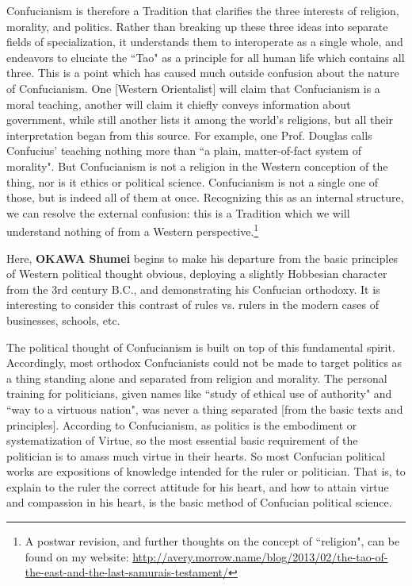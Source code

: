 Confucianism is therefore a Tradition that clarifies the three interests of religion, morality, and politics. Rather than breaking up these three ideas into separate fields of specialization, it understands them to interoperate as a single whole, and endeavors to eluciate the ``Tao" as a principle for all human life which contains all three. This is a point which has caused much outside confusion about the nature of Confucianism. One [Western Orientalist] will claim that Confucianism is a moral teaching, another will claim it chiefly conveys information about government, while still another lists it among the world's religions, but all their interpretation began from this source. For example, one Prof. Douglas calls Confucius' teaching nothing more than ``a plain, matter-of-fact system of morality". But Confucianism is not a religion in the Western conception of the thing, nor is it ethics or political science. Confucianism is not a single one of those, but is indeed all of them at once. Recognizing this as an internal structure, we can resolve the external confusion: this is a Tradition which we will understand nothing of from a Western perspective.\footnote{A postwar revision, and further thoughts on the concept of ``religion", can be found on my website: \url{http://avery.morrow.name/blog/2013/02/the-tao-of-the-east-and-the-last-samurais-testament/} }

\begin{quotex}
Here, \textbf{OKAWA Shumei} begins to make his departure from the basic principles of Western political thought obvious, deploying a slightly Hobbesian character from the 3rd century B.C., and demonstrating his Confucian orthodoxy. It is interesting to consider this contrast of rules vs. rulers in the modern cases of businesses, schools, etc.

\end{quotex}
The political thought of Confucianism is built on top of this fundamental spirit. Accordingly, most orthodox Confucianists could not be made to target politics as a thing standing alone and separated from religion and morality. The personal training for politicians, given names like ``study of ethical use of authority" and ``way to a virtuous nation", was never a thing separated [from the basic texts and principles]. According to Confucianism, as politics is the embodiment or systematization of Virtue, so the most essential basic requirement of the politician is to amass much virtue in their hearts. So most Confucian political works are expositions of knowledge intended for the ruler or politician. That is, to explain to the ruler the correct attitude for his heart, and how to attain virtue and compassion in his heart, is the basic method of Confucian political science.

